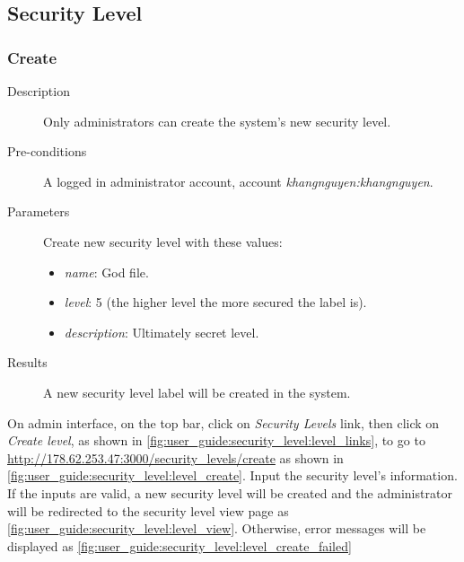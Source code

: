 \subsection{Security Level}
\label{ch:result:user_guide:security_level}
\subsubsection{Create}
\label{ch:result:user_guide:security_level:create}

\begin{description}
\item[Description] Only administrators can create the system's new security level.
\item[Pre-conditions] A logged in administrator account, \eg account \emph{khangnguyen:khangnguyen}.
\item[Parameters] Create new security level with these values:
\begin{itemize}
\item \emph{name}: God file.
\item \emph{level}: 5 (the higher level the more secured the label is).
\item \emph{description}: Ultimately secret level.
\end{itemize}
\item[Results] A new security level label will be created in the system.
\end{description}

On admin interface, on the top bar, click on \emph{Security Levels} link, then click on \emph{Create level}, as shown in \autoref{fig:user_guide:security_level:level_links}, 
to go to \href{http://178.62.253.47:3000/security\_levels/create}{http://178.62.253.47:3000/security\_levels/create} as shown in \autoref{fig:user_guide:security_level:level_create}.
Input the security level's information.
If the inputs are valid, a new security level will be created and the administrator will be redirected to the security level view page as \autoref{fig:user_guide:security_level:level_view}.
Otherwise, error messages will be displayed as \autoref{fig:user_guide:security_level:level_create_failed}

